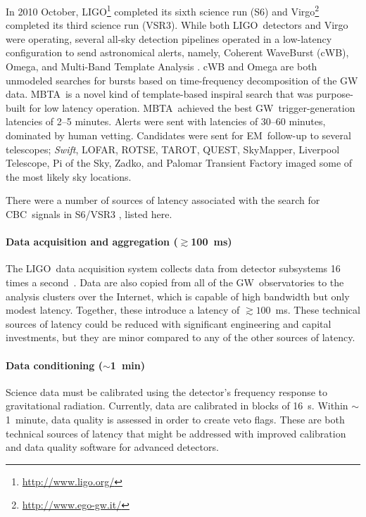 \documentclass[preprint2]{aastex}
\newcommand{\mbta}{MBTA}
\newcommand{\GW}{GW}%
\newcommand{\EM}{EM}%
\newcommand{\CBC}{CBC}%
\newcommand{\LIGO}{LIGO}%
\begin{document}
In 2010 October, \LIGO{}\footnote{\url{http://www.ligo.org/}} completed its
sixth science run (S6) and Virgo\footnote{\url{http://www.ego-gw.it/}}
completed its third science run (VSR3).  While both \LIGO\ detectors and Virgo
were operating, several all-sky detection pipelines operated in a low-latency
configuration to send astronomical alerts, namely, Coherent WaveBurst (cWB), Omega, and Multi-Band Template Analysis \citep[MBTA;][]{HugheyGWPAW2011, S6lowlatency2, S6lowlatency3, S6lowlatency4}.  cWB and Omega are both unmodeled searches for bursts based on time-frequency decomposition of the GW data.  \mbta\ is a novel kind of template-based inspiral search that was purpose-built for low latency operation.  \mbta\ achieved the best \GW\ trigger-generation latencies of 2--5 minutes.
Alerts were sent with latencies of 30--60 minutes, dominated by human vetting.
Candidates were sent for \EM\ follow-up to several telescopes; \textit{Swift},
LOFAR, ROTSE, TAROT, QUEST, SkyMapper,
Liverpool Telescope, Pi of the Sky, Zadko, and Palomar Transient Factory
\citep{kanner2008, HugheyGWPAW2011} imaged some of the most likely sky
locations.

There were a number of sources of latency associated with the search for
\CBC\ signals in S6/VSR3 \citep{HugheyGWPAW2011}, listed here.

\paragraph{Data acquisition and aggregation ($\gtrsim$100~ms)}%
The \LIGO\ data acquisition system collects data from detector subsystems 16
times a second~\citep{Bork2001}. Data are also copied from all of the \GW\
observatories to the analysis clusters over the Internet, which is capable of
high bandwidth but only modest latency.  Together, these introduce a latency of
$\gtrsim$$100$~ms.  These technical sources of latency could be reduced with
significant engineering and capital investments, but they are minor compared
to any of the other sources of latency.

\paragraph{Data conditioning ($\sim$1~min)}%
Science data must be calibrated using the detector's frequency response to
gravitational radiation.  Currently, data are calibrated in blocks of 16~s.
Within $\sim$1~minute, data quality is assessed in order to create veto flags.
These are both technical sources of latency that might be addressed with
improved calibration and data quality software for advanced detectors.
\end{document}
